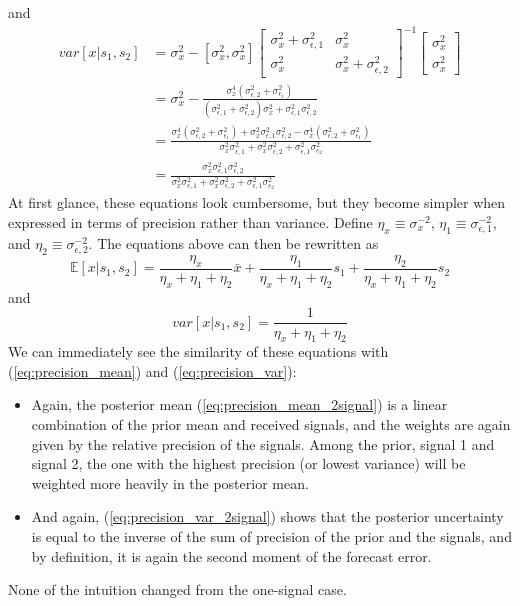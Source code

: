 \documentclass[12pt]{article}
\begin{document}
and
\begin{align}
	var[x|s_1, s_2] & = \sigma^2_x - [\sigma^2_x, \sigma^2_x] \begin{bmatrix}
		\sigma^2_x + \sigma^2_{\epsilon,1} & \sigma^2_x \\ \sigma^2_x & \sigma^2_x + \sigma^2_{\epsilon,2}
	\end{bmatrix}^{-1} \begin{bmatrix}
	\sigma^2_x \\ \sigma^2_x
\end{bmatrix} \nonumber \\
& = \sigma^2_x - \frac{\sigma^4_x(\sigma^2_{\epsilon, 2} + \sigma^2_{\epsilon_1})}{(\sigma^2_{\epsilon,1} + \sigma^2_{\epsilon,2}) \sigma^2_x + \sigma^2_{\epsilon,1}\sigma^2_{\epsilon,2}} \nonumber \\
& = \frac{\sigma^4_x(\sigma^2_{\epsilon, 2} + \sigma^2_{\epsilon_1}) + \sigma^2_x \sigma^{2}_{\epsilon, 1} \sigma^2_{\epsilon,2} - \sigma^4_x(\sigma^2_{\epsilon, 2} + \sigma^2_{\epsilon_1})}{\sigma^2_x \sigma^2_{\epsilon, 1} + \sigma^2_x \sigma^2_{\epsilon, 2} + \sigma^2_{\epsilon, 1} \sigma^2_{\epsilon_2}} \nonumber \\
& = \frac{ \sigma^2_x \sigma^{2}_{\epsilon, 1} \sigma^2_{\epsilon,2}}{\sigma^2_x \sigma^2_{\epsilon, 1} + \sigma^2_x \sigma^2_{\epsilon, 2} + \sigma^2_{\epsilon, 1} \sigma^2_{\epsilon_2}} 
\end{align}
At first glance, these equations look cumbersome, but they become simpler when expressed in terms of precision rather than variance. Define $\eta_x \equiv \sigma_x^{-2}$, $\eta_1 \equiv \sigma^{-2}_{\epsilon,1}$, and $\eta_2 \equiv \sigma^{-2}_{\epsilon,2}$. The equations above can then be rewritten as
\begin{equation} \label{eq:precision_mean_2signal}
	\mathbb{E}[x|s_1, s_2] = \frac{\eta_x}{\eta_x + \eta_1 + \eta_2}\bar{x} + \frac{\eta_1}{\eta_x + \eta_1 + \eta_2} s_1 + \frac{\eta_2}{\eta_x + \eta_1 + \eta_2} s_2 
\end{equation}
and 
\begin{equation} \label{eq:precision_var_2signal}
	var[x|s_1, s_2] = \frac{1}{\eta_x + \eta_1 + \eta_2}
\end{equation}
We can immediately see the similarity of these equations with (\ref{eq:precision_mean}) and (\ref{eq:precision_var}):
\begin{itemize}
	\item Again, the posterior mean (\ref{eq:precision_mean_2signal}) is a linear combination of the prior mean and received signals, and the weights are again given by the relative precision of the signals. Among the prior, signal 1 and signal 2, the one with the highest precision (or lowest variance) will be weighted more heavily in the posterior mean. 
	\item And again, (\ref{eq:precision_var_2signal}) shows that the posterior uncertainty is equal to the inverse of the sum of precision of the prior and the signals, and by definition, it is again the second moment of the forecast error. 
\end{itemize}
None of the intuition changed from the one-signal case.  
\end{document}
